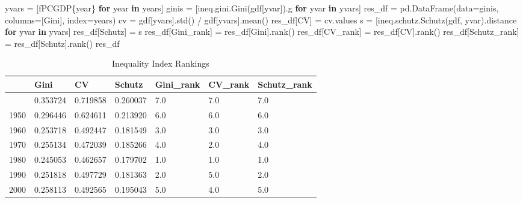 \documentclass[
  a4paper, 
  twoside,
  final
]{article}
\newenvironment{Shaded}{\begin{snugshade}}{\end{snugshade}}
\newcommand{\ControlFlowTok}[1]{\textcolor[rgb]{0.00,0.23,0.31}{\textbf{#1}}}
\newcommand{\KeywordTok}[1]{\textcolor[rgb]{0.00,0.23,0.31}{\textbf{#1}}}
\newcommand{\NormalTok}[1]{\textcolor[rgb]{0.00,0.23,0.31}{#1}}
\newcommand{\OperatorTok}[1]{\textcolor[rgb]{0.37,0.37,0.37}{#1}}
\newcommand{\SpecialCharTok}[1]{\textcolor[rgb]{0.37,0.37,0.37}{#1}}
\newcommand{\SpecialStringTok}[1]{\textcolor[rgb]{0.13,0.47,0.30}{#1}}
\newcommand{\StringTok}[1]{\textcolor[rgb]{0.13,0.47,0.30}{#1}}
\begin{document}
\begin{Shaded}
\begin{Highlighting}[]
\NormalTok{yvars }\OperatorTok{=}\NormalTok{ [}\SpecialStringTok{f\textquotesingle{}PCGDP}\SpecialCharTok{\{}\NormalTok{year}\SpecialCharTok{\}}\SpecialStringTok{\textquotesingle{}} \ControlFlowTok{for}\NormalTok{ year }\KeywordTok{in}\NormalTok{ years]}
\NormalTok{ginis }\OperatorTok{=}\NormalTok{ [ineq.gini.Gini(gdf[yvar]).g }\ControlFlowTok{for}\NormalTok{ yvar }\KeywordTok{in}\NormalTok{ yvars]}
\NormalTok{res\_df }\OperatorTok{=}\NormalTok{ pd.DataFrame(data}\OperatorTok{=}\NormalTok{ginis, columns}\OperatorTok{=}\NormalTok{[}\StringTok{\textquotesingle{}Gini\textquotesingle{}}\NormalTok{], index}\OperatorTok{=}\NormalTok{years)}
\NormalTok{cv }\OperatorTok{=}\NormalTok{ gdf[yvars].std() }\OperatorTok{/}\NormalTok{ gdf[yvars].mean() }
\NormalTok{res\_df[}\StringTok{\textquotesingle{}CV\textquotesingle{}}\NormalTok{] }\OperatorTok{=}\NormalTok{ cv.values}
\NormalTok{s }\OperatorTok{=}\NormalTok{ [ineq.schutz.Schutz(gdf, yvar).distance }\ControlFlowTok{for}\NormalTok{ yvar }\KeywordTok{in}\NormalTok{ yvars]}
\NormalTok{res\_df[}\StringTok{\textquotesingle{}Schutz\textquotesingle{}}\NormalTok{] }\OperatorTok{=}\NormalTok{ s}
\NormalTok{res\_df[}\StringTok{\textquotesingle{}Gini\_rank\textquotesingle{}}\NormalTok{] }\OperatorTok{=}\NormalTok{ res\_df[}\StringTok{\textquotesingle{}Gini\textquotesingle{}}\NormalTok{].rank()}
\NormalTok{res\_df[}\StringTok{\textquotesingle{}CV\_rank\textquotesingle{}}\NormalTok{] }\OperatorTok{=}\NormalTok{ res\_df[}\StringTok{\textquotesingle{}CV\textquotesingle{}}\NormalTok{].rank()}
\NormalTok{res\_df[}\StringTok{\textquotesingle{}Schutz\_rank\textquotesingle{}}\NormalTok{] }\OperatorTok{=}\NormalTok{ res\_df[}\StringTok{\textquotesingle{}Schutz\textquotesingle{}}\NormalTok{].rank()}
\NormalTok{res\_df}
\end{Highlighting}
\end{Shaded}

\begin{longtable}[]{@{}lllllll@{}}

\caption{\label{tbl-rankings}Inequality Index Rankings}

\tabularnewline

\toprule\noalign{}
& Gini & CV & Schutz & Gini\_rank & CV\_rank & Schutz\_rank \\
\midrule\noalign{}
\endhead
\bottomrule\noalign{}
\endlastfoot
1940 & 0.353724 & 0.719858 & 0.260037 & 7.0 & 7.0 & 7.0 \\
1950 & 0.296446 & 0.624611 & 0.213920 & 6.0 & 6.0 & 6.0 \\
1960 & 0.253718 & 0.492447 & 0.181549 & 3.0 & 3.0 & 3.0 \\
1970 & 0.255134 & 0.472039 & 0.185266 & 4.0 & 2.0 & 4.0 \\
1980 & 0.245053 & 0.462657 & 0.179702 & 1.0 & 1.0 & 1.0 \\
1990 & 0.251818 & 0.497729 & 0.181363 & 2.0 & 5.0 & 2.0 \\
2000 & 0.258113 & 0.492565 & 0.195043 & 5.0 & 4.0 & 5.0 \\

\end{longtable}
\end{document}
